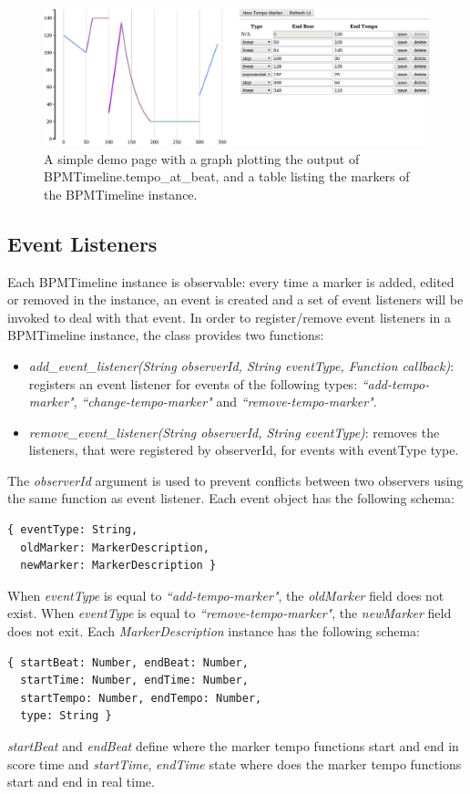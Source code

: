 \documentclass{sig-alternate}
\begin{document}
\begin{sloppypar}
\begin{figure}
	\includegraphics[width=5.7in]{demo.png}
	\caption{A simple demo page with a graph plotting the output of BPMTimeline.tempo\_at\_beat, and a table listing the markers of the BPMTimeline instance.}
	\label{fig:demosurface} 
\end{figure}
\end{sloppypar}
\subsection{Event Listeners}
\begin{sloppypar}
Each BPMTimeline instance is observable: every time a marker is added, edited or removed in the instance, an event is created and a set of event listeners will be invoked to deal with that event. In order to register/remove event listeners in a BPMTimeline instance, the class provides two functions:
\begin{itemize}
	\item \textit{add\_event\_listener(String observerId, String eventType, Function callback)}: registers an event listener for events of the following types: \textit{``add-tempo-marker"}, \textit{``change-tempo-marker"} and \textit{``remove-tempo-marker"}.
	\item \textit{remove\_event\_listener(String observerId, String eventType)}: removes the listeners, that were registered by observerId, for events with eventType type.
\end{itemize}	
The \textit{observerId} argument is used to prevent conflicts between two observers using the same function as event listener. Each event object has the following schema:
\begin{lstlisting}
{ eventType: String, 
  oldMarker: MarkerDescription, 
  newMarker: MarkerDescription }
\end{lstlisting}
When \textit{eventType} is equal to \textit{``add-tempo-marker"}, the \textit{oldMarker} field does not exist. When \textit{eventType} is equal to \textit{``remove-tempo-marker"}, the \textit{newMarker} field does not exit. Each \textit{MarkerDescription} instance has the following schema: 
\begin{lstlisting}
{ startBeat: Number, endBeat: Number, 
  startTime: Number, endTime: Number, 
  startTempo: Number, endTempo: Number, 
  type: String }
\end{lstlisting}
\textit{startBeat} and \textit{endBeat} define where the marker tempo functions start and end in score time and \textit{startTime}, \textit{endTime} state where does the marker tempo functions start and end in real time.
\end{sloppypar}
\end{document}
